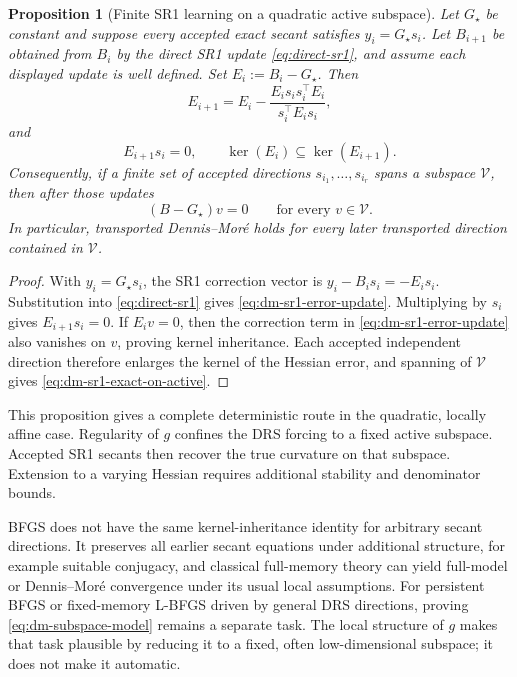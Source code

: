 \documentclass[10pt,leqno]{amsart}
\numberwithin{equation}{section}
\numberwithin{algorithm}{section}
\newtheorem{proposition}[theorem]{Proposition}
\theoremstyle{remark}
\begin{document}
\begin{proposition}[Finite SR1 learning on a quadratic active subspace]
\label{prop:dm-sr1-active-learning}
Let $G_\star$ be constant and suppose every accepted exact secant satisfies
$y_i=G_\star s_i$.  Let $B_{i+1}$ be obtained from $B_i$ by the direct SR1 update \eqref{eq:direct-sr1}, and assume each displayed update is well defined.  Set
$E_i:=B_i-G_\star$.  Then
\begin{equation}
\label{eq:dm-sr1-error-update}
    E_{i+1}
    =E_i-\frac{E_is_i s_i^\top E_i}{s_i^\top E_i s_i},
\end{equation}
and
\begin{equation}
\label{eq:dm-sr1-kernel-inheritance}
    E_{i+1}s_i=0,
    \qquad
    \ker(E_i)\subseteq\ker(E_{i+1}).
\end{equation}
Consequently, if a finite set of accepted directions $s_{i_1},\ldots,s_{i_r}$ spans a subspace $\mathcal V$, then after those updates
\begin{equation}
\label{eq:dm-sr1-exact-on-active}
    (B-G_\star)v=0
    \qquad\text{for every }v\in\mathcal V.
\end{equation}
In particular, transported Dennis--Mor\'e holds for every later transported direction contained in $\mathcal V$.
\end{proposition}

\begin{proof}
With $y_i=G_\star s_i$, the SR1 correction vector is
$y_i-B_is_i=-E_is_i$.  Substitution into \eqref{eq:direct-sr1} gives
\eqref{eq:dm-sr1-error-update}.  Multiplying by $s_i$ gives
$E_{i+1}s_i=0$.  If $E_iv=0$, then the correction term in
\eqref{eq:dm-sr1-error-update} also vanishes on $v$, proving kernel inheritance.
Each accepted independent direction therefore enlarges the kernel of the Hessian error, and spanning of $\mathcal V$ gives \eqref{eq:dm-sr1-exact-on-active}.
\end{proof}

This proposition gives a complete deterministic route in the quadratic, locally affine case.  Regularity of $g$ confines the DRS forcing to a fixed active subspace.  Accepted SR1 secants then recover the true curvature on that subspace.  Extension to a varying Hessian requires additional stability and denominator bounds.

BFGS does not have the same kernel-inheritance identity for arbitrary secant directions.  It preserves all earlier secant equations under additional structure, for example suitable conjugacy, and classical full-memory theory can yield full-model or Dennis--Mor\'e convergence under its usual local assumptions.  For persistent BFGS or fixed-memory L-BFGS driven by general DRS directions, proving \eqref{eq:dm-subspace-model} remains a separate task.  The local structure of $g$ makes that task plausible by reducing it to a fixed, often low-dimensional subspace; it does not make it automatic.
\end{document}
